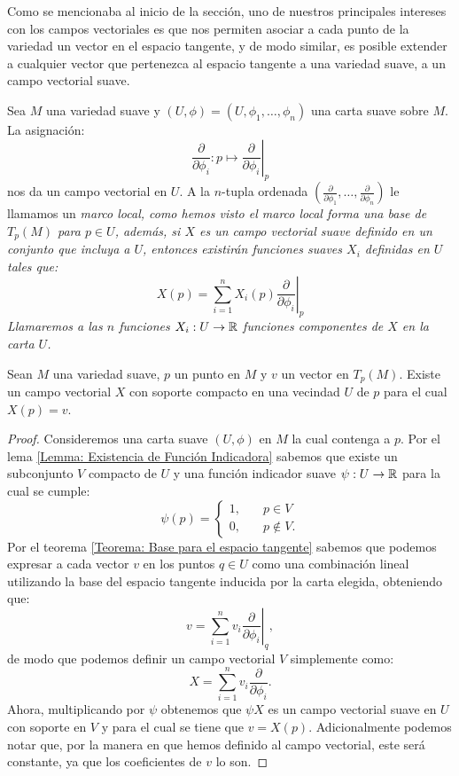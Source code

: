 Como se mencionaba al inicio de la sección, uno de nuestros principales intereses con los campos vectoriales es que nos permiten asociar a cada punto de la variedad un vector en el espacio tangente, y de modo similar, es posible extender a cualquier vector que pertenezca al espacio tangente a una variedad suave, a un campo vectorial suave.

\begin{example}\label{Ejemplo: Campo Vectorial en M}
	Sea $M$ una variedad suave y $(U,\phi)=(U,\phi_1, \dots,\phi_n)$ una carta suave sobre $M$. La asignación:
	\[
		\frac{\partial}{\partial \phi_i}: p \mapsto \left. \frac{\partial}{\partial \phi_i}\right|_{p}
	\]
	nos da un campo vectorial en $U$. A la $n$-tupla ordenada $(\frac{\partial}{\partial \phi_1}, \dots, \frac{\partial}{\partial \phi_n})$ le llamamos un \it{marco local}, como hemos visto el marco local forma una base de $T_p(M)$ para $p \in U$, además, si $X$ es un campo vectorial suave definido en un conjunto que incluya a $U$, entonces existirán funciones suaves $X_i$ definidas en $U$ tales que:
	\[
		X(p) = \sum_{i=1}^{n}X_i(p)\left.\frac{\partial}{\partial\phi_i} \right|_{p}
	\]
	Llamaremos a las $n$ funciones $X_i: U \to \mathbb{R}$ \it{funciones componentes de $X$} en la carta $U$.
\end{example}


\begin{lemma}\label{Lema: Existencia de Campo Vectorial Suave}
	Sean $M$ una variedad suave, $p$ un punto en $M$ y $v$ un vector en $T_p(M)$. Existe un campo vectorial $X$ con soporte compacto en una vecindad $U$ de $p$ para el cual $X(p) = v$.
\end{lemma}

\begin{proof}
	Consideremos una carta suave $(U,\phi)$ en $M$ la cual contenga a $p$. Por el lema \ref{Lemma: Existencia de Función Indicadora} sabemos que existe un subconjunto $V$ compacto de $U$ y una función indicador suave $\psi: U \to \mathbb{R}$ para la cual se cumple:
	\[
		\psi(p) = \begin{cases}
			1, \quad & p \in V     \\
			0, \quad & p \notin V.
		\end{cases}
	\]
	Por el teorema \ref{Teorema: Base para el espacio tangente} sabemos que podemos expresar a cada vector $v$ en los puntos $q \in U$ como una combinación lineal utilizando la base del espacio tangente inducida por la carta elegida, obteniendo que:
	\[
		v = \sum_{i=1}^{n} v_i
		\left. \frac{\partial}{\partial \phi_i} \right|_q,
	\]
	de modo que podemos definir un campo vectorial $V$ simplemente como:
	\[
		X = \sum_{i=1}^n v_i \frac{\partial}{\partial \phi_i}.
	\]
	Ahora, multiplicando por $\psi$ obtenemos que $\psi X$ es un campo vectorial suave en $U$ con soporte en $V$ y para el cual se tiene que $v = X(p)$. Adicionalmente podemos notar que, por la manera en que hemos definido al campo vectorial, este será constante, ya que los coeficientes de $v$ lo son.
\end{proof}

